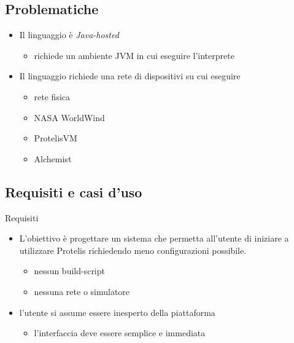     \subsection{Problematiche}

    \begin{frame}{\insertsectionhead}{\insertsubsectionhead}

      \begin{block}{\insertsubsectionhead}
        \begin{itemize}[<+->]
          \item
            Il linguaggio è \emph{Java-hosted}
            \begin{itemize}
              \item richiede un ambiente JVM in cui eseguire l'interprete
            \end{itemize}
          \item
            Il linguaggio richiede una rete di dispositivi su cui eseguire
            \begin{itemize}[<+->]
              \item rete fisica
              \item NASA WorldWind  %
              \item ProtelisVM      %
              \item Alchemist       %
            \end{itemize}
        \end{itemize}
      \end{block}
    \end{frame}

    \subsection{Requisiti e casi d'uso}

    \begin{frame}{\insertsectionhead}{\insertsubsectionhead}

      \begin{block}{Requisiti}
        \begin{itemize}
          \item
            L'obiettivo è progettare un sistema che permetta all'utente di iniziare a utilizzare Protelis richiedendo meno configurazioni possibile.
            \begin{itemize}
              \item nessun build-script
              \item nessuna rete o simulatore
            \end{itemize}
          \item
            l'utente si assume essere inesperto della piattaforma
            \begin{itemize}
              \item l'interfaccia deve essere semplice e immediata
            \end{itemize}
        \end{itemize}
      \end{block}

    \end{frame}

